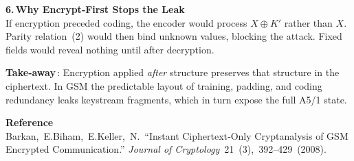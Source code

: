 \begin{technical}
\bigskip
\noindent\textbf{6.\,Why Encrypt‑First Stops the Leak}\\[0.5em]
If encryption preceded coding, the encoder would process \(X \oplus K'\) rather than \(X\).
Parity relation (2) would then bind unknown values, blocking the attack. Fixed
fields would reveal nothing until after decryption.

\medskip
\noindent\textbf{Take‑away}\,: Encryption applied \emph{after} structure preserves that structure
in the ciphertext.  In GSM the predictable layout of training, padding, and coding
redundancy leaks keystream fragments, which in turn expose the full A5/1 state.

\vspace{0.6em}
\noindent\textbf{Reference}\\[0.3em]
{\small
Barkan, E.\;Biham, E.\;Keller, N.\ “Instant Ciphertext‑Only Cryptanalysis of GSM Encrypted Communication.” \textit{Journal of Cryptology} 21 (3), 392–429 (2008).}
\end{technical}
